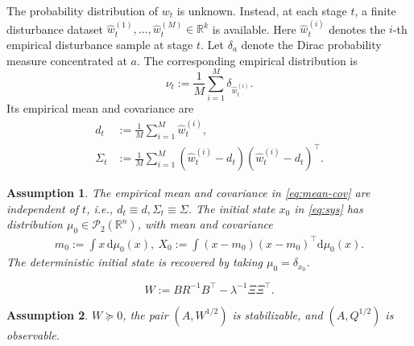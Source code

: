 \documentclass[10pt,a4paper]{amsart}
\newtheorem{assumption}{Assumption}
\newcommand{\dd}{\mathrm{d}}
\begin{document}
The probability distribution of \(w_t\) is unknown.  Instead, at each stage \(t\), a finite disturbance dataset
\(
\widehat w_t^{(1)},\ldots,\widehat w_t^{(M)}\in\mathbb R^k
\)
is available.  Here \(\widehat w_t^{(i)}\) denotes the \(i\)-th empirical disturbance sample at stage \(t\).  Let \(\delta_a\) denote the Dirac probability measure concentrated at \(a\).  The corresponding empirical distribution is
\begin{equation}
	\nu_t:=\frac1M\sum_{i=1}^M\delta_{\widehat w_t^{(i)}} .
	\label{eq:empirical-law}
\end{equation}
 Its empirical mean and covariance are
\begin{equation}
	\begin{aligned}
		d_t
		&:=
		\frac1M\sum_{i=1}^M\widehat w_t^{(i)},\\
		\Sigma_t
		&:=
		\frac1M\sum_{i=1}^M
		(\widehat w_t^{(i)}-d_t)
		(\widehat w_t^{(i)}-d_t)^\top .
	\end{aligned}
	\label{eq:mean-cov}
\end{equation}

\begin{assumption}
	\label{ass:stationary-empirical}
	The empirical mean and covariance in \eqref{eq:mean-cov} are independent of \(t\), i.e.,
	 $d_t\equiv d,
		\Sigma_t\equiv\Sigma$. The initial state $x_0$ in \eqref{eq:sys} has distribution \(\mu_0\in\mathcal P_2(\mathbb R^n)\), with mean and
	covariance
	\begin{equation}
		\begin{aligned}
			m_0:=\!\!\int \!x\,\dd\mu_0(x),
			~X_0\!:=\!\!\int \!(x-m_0)(x-m_0)^\top\dd\mu_0(x).
		\end{aligned}
		\label{eq:initial-ensemble-moments}
	\end{equation}
	The deterministic initial state is recovered by taking
	\(\mu_0=\delta_{x_0}\).
\end{assumption}

\begin{equation}
	W:=BR^{-1}B^\top-\lambda^{-1}\Xi\Xi^\top .
	\label{eq:W-def-bellman}
\end{equation}

\begin{assumption}
	\label{ass:psd-W}
	$W\succeq0$, the pair \((A,W^{1/2})\) is stabilizable, and $(A,Q^{1/2})$ is observable.
\end{assumption}
\end{document}
